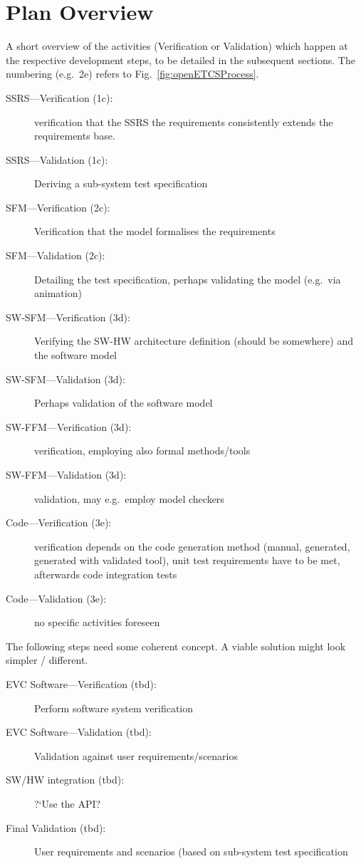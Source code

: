 \documentclass{template/openetcs_report}
\newcommand{\qq}[1]{?`#1?}
\begin{document}
\section{\VV Plan Overview}
\label{sec:plan-overview}


A short overview of the activities (Verification or Validation) which
happen at the respective development steps, to be detailed in the
subsequent sections. The numbering (e.g.\ 2e) refers to
Fig.~\ref{fig:openETCSProcess}.

\begin{description}
\item[SSRS---Verification (1c):] verification that the SSRS the requirements
  consistently extends the requirements base. 
\item[SSRS---Validation (1c):] Deriving a sub-system test specification
\item[SFM---Verification (2c):] Verification that the model formalises
  the requirements
\item[SFM---Validation (2c):] Detailing the test specification,
  perhaps validating the model (e.g.\ via animation)
\item[SW-SFM---Verification (3d):] Verifying the SW-HW architecture
  definition (should be somewhere) and the software model
\item[SW-SFM---Validation (3d):]Perhaps validation of the software model
\item[SW-FFM---Verification (3d):]  verification, employing also
  formal methods/tools 
\item[SW-FFM---Validation (3d):] validation, may e.g.\ employ model checkers
\item[Code---Verification (3e):] verification depends on the code
  generation method (manual, generated, generated with validated
  tool), unit test requirements have to be met, afterwards code
  integration tests
\item[Code---Validation (3e):] no specific activities foreseen
\end{description}

The following steps need some coherent concept. A viable solution
might look simpler / different.  
\begin{description}
\item[EVC Software---Verification (tbd):] Perform software system verification
\item[EVC Software---Validation (tbd):] Validation against user
  requirements/scenarios 
\item[SW/HW integration (tbd):] \qq{Use the API}
\item[Final Validation (tbd):] User requirements and scenarios (based
  on sub-system test specification
\end{description}
\end{document}
